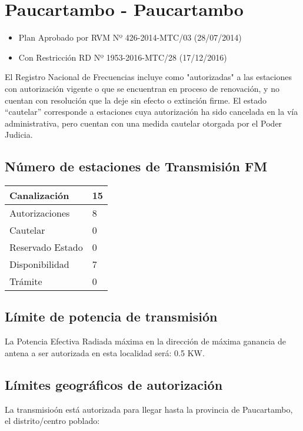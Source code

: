\documentclass[a4paper]{IEEEtran} %
\begin{document}
\section{Paucartambo - Paucartambo}

\begin{itemize}
	\item Plan Aprobado por RVM Nº 426-2014-MTC/03 (28/07/2014)
	\item Con Restricción RD Nº 1953-2016-MTC/28 (17/12/2016)
\end{itemize}

El Registro Nacional de Frecuencias incluye como "autorizadas" a las estaciones con autorización vigente o que se encuentran en proceso de renovación, y no cuentan con resolución que la deje sin efecto o extinción firme. El estado “cautelar” corresponde a estaciones cuya autorización ha sido cancelada en la vía administrativa, pero cuentan con una medida cautelar otorgada por el Poder Judicia.

\subsection{Número de estaciones de Transmisión FM}

\begin{tabular}{|l|l|} \hline
	Canalización 			& 15 \\ \hline
	Autorizaciones			& 8 \\ \hline
	Cautelar				& 0 \\ \hline
	Reservado Estado		& 0 \\ \hline
	Disponibilidad			& 7 \\ \hline
	Trámite					& 0 \\ \hline 
\end{tabular}

\subsection{Límite de potencia de transmisión}

La Potencia Efectiva Radiada máxima en la dirección de máxima ganancia de antena a ser autorizada en esta localidad será: 0.5 KW.

\subsection{Límites geográficos de autorización}

La transmisioón está autorizada para llegar hasta la provincia de Paucartambo, el distrito/centro poblado:
\end{document}
